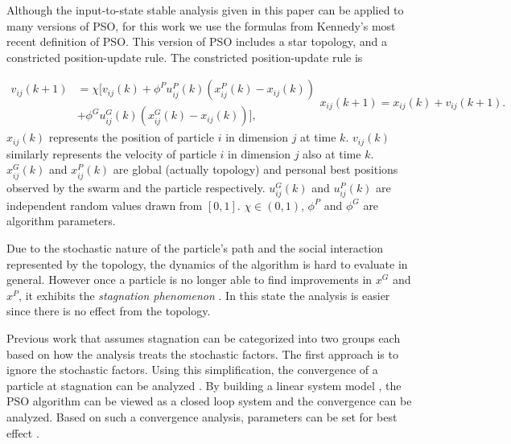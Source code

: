 \documentclass{sig-alternate}
\begin{document}
Although the input-to-state stable analysis given in this paper can be applied to many versions of PSO,
for this work we use the formulas from Kennedy's most recent definition of PSO\cite{4223164}.
This version of PSO includes a star topology, and a constricted position-update rule. 
The constricted position-update rule is

\begin{subequations}
\label{eq:pso_alg}
\begin{equation}
\label{eq:up_vel}
\begin{aligned}
v_{ij}(k+1) & = \chi [ v_{ij}(k) 
+ \phi^{P} u^{P}_{ij}(k) (x^{P}_{ij}(k) - x_{ij}(k))
\\ & + \phi^{G} u^{G}_{ij}(k) ( x^{G}_{ij}(k) - x_{ij}(k)) ],
\end{aligned}
\end{equation}
\begin{equation}
\label{eq:up_pos}
x_{ij}(k+1) = x_{ij}(k) + v_{ij}(k+1).
\end{equation}
\end{subequations}
$ x_{ij}(k) $ represents the position of particle $ i $ in dimension $ j $ at time $ k $.
$ v_{ij}(k) $ similarly represents the velocity of particle $ i $ in dimension $ j $ also at time $ k $.
$ x^{G}_{ij}(k) $ and $ x^{P}_{ij}(k) $ are global (actually topology) and personal best positions observed by the swarm and the particle respectively. 
$ u^{G}_{ij}(k) $ and $ u^{P}_{ij}(k) $ are independent random values drawn from $ [0,1] $.
$ \chi \in ( 0, 1 ) $, $ \phi^{P} $ and $ \phi^{G} $ are algorithm parameters.

Due to the stochastic nature of the particle's path and the social interaction represented by the topology, the dynamics of the algorithm is hard to evaluate in general.
However once a particle is no longer able to find improvements in $ x^{G} $ and $ x^{P} $, it exhibits the \emph{stagnation phenomenon} \cite{Clerc06stagnationanalysis}.
In this state the analysis is easier since there is no effect from the topology.

Previous work that assumes stagnation can be categorized into two groups each based on how the analysis treats the stochastic factors.
The first approach is to ignore the stochastic factors.
Using this simplification, the convergence of a particle at stagnation can be analyzed \cite{985692}. 
By building a linear system model \cite{4424687}, the PSO algorithm can be viewed as a closed loop system and the convergence can be analyzed.
Based on such a convergence analysis, parameters can be set for best effect \cite{Trelea2003317}.
\end{document}
